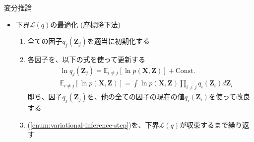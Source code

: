 \documentclass[dvipdfmx,notheorems,t]{beamer}
\begin{document}
\begin{frame}{変分推論}

\begin{itemize}
	\item 下界$\mathcal{L}(q)$の最適化 (\alert{座標降下法})
	\begin{enumerate}
		\item 全ての因子$q_j(\bm{Z}_j)$を適当に初期化する
		\newline
		\item 各因子を、以下の式を使って更新する \label{enum:variational-inference-step}
		\begin{eqnarray}
			&& \ln q_j(\bm{Z}_j) = \mathbb{E}_{i \neq j}[\ln p(\bm{X}, \bm{Z})] + \mathrm{Const.} \\
			&& \mathbb{E}_{i \neq j}[\ln p(\bm{X}, \bm{Z})] = \int \ln p(\bm{X}, \bm{Z}) \prod_{i \neq j} q_i(\bm{Z}_i) d\bm{Z}_i
		\end{eqnarray}
		即ち、因子$q_j(\bm{Z}_j)$を、他の全ての因子の現在の値$q_i(\bm{Z}_i)$を使って改良する
		\newline
		\item (\ref{enum:variational-inference-step})を、下界$\mathcal{L}(q)$が収束するまで繰り返す
	\end{enumerate}
\end{itemize}

\end{frame}
\end{document}
